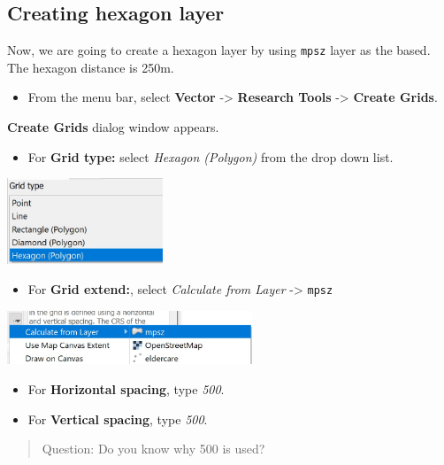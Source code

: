 \documentclass[
  letterpaper,
  DIV=11,
  numbers=noendperiod]{scrreprt}
\providecommand{\tightlist}{%
  \setlength{\itemsep}{0pt}\setlength{\parskip}{0pt}}\usepackage{longtable,booktabs,array}
\begin{document}
\hypertarget{creating-hexagon-layer}{%
\subsection{Creating hexagon layer}\label{creating-hexagon-layer}}

Now, we are going to create a hexagon layer by using \texttt{mpsz} layer
as the based. The hexagon distance is 250m.

\begin{itemize}
\tightlist
\item
  From the menu bar, select \textbf{Vector} -\textgreater{}
  \textbf{Research Tools} -\textgreater{} \textbf{Create Grids}.
\end{itemize}

\textbf{Create Grids} dialog window appears.

\begin{itemize}
\tightlist
\item
  For \textbf{Grid type:} select \emph{Hexagon (Polygon)} from the drop
  down list.
\end{itemize}

\includegraphics[width=0.35\textwidth,height=\textheight]{./img09/image1.jpg}

\begin{itemize}
\tightlist
\item
  For \textbf{Grid extend:}, select \emph{Calculate from Layer}
  -\textgreater{} \texttt{mpsz}
\end{itemize}

\includegraphics[width=0.55\textwidth,height=\textheight]{./img09/image2.jpg}

\begin{itemize}
\tightlist
\item
  For \textbf{Horizontal spacing}, type \emph{500}.
\item
  For \textbf{Vertical spacing}, type \emph{500}.
\end{itemize}

\begin{quote}
Question: Do you know why 500 is used?
\end{quote}
\end{document}
